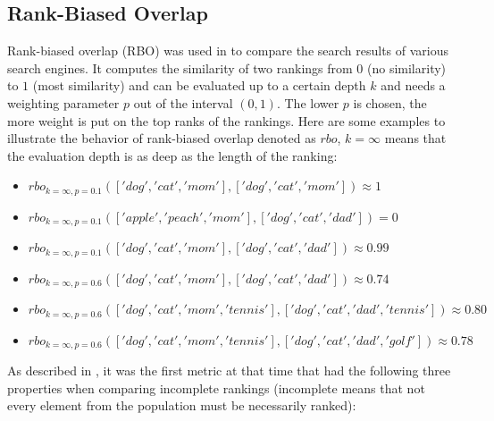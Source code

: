 \documentclass[draft,final]{thesisclass} %
\begin{document}
\subsection{Rank-Biased Overlap}
Rank-biased overlap (RBO) was used in \cite{rank_biased_overlap} to compare the search results of various search engines.
It computes the similarity of two rankings from $0$ (no similarity) to $1$ (most similarity) and can be evaluated up to a certain depth $k$ and needs a weighting parameter $p$ out of the interval $(0,1)$.
The lower $p$ is chosen, the more weight is put on the top ranks of the rankings.
Here are some examples to illustrate the behavior of rank-biased overlap denoted as $rbo$, $k=\infty$ means that the evaluation depth is as deep as the length of the ranking:
\begin{itemize}
    \item $rbo_{k=\infty,p=0.1}(['dog','cat','mom'],['dog','cat','mom']) \approx 1$
    \item $rbo_{k=\infty,p=0.1}(['apple','peach','mom'],['dog','cat','dad']) = 0$
    \item $rbo_{k=\infty,p=0.1}(['dog','cat','mom'],['dog','cat','dad']) \approx 0.99$
    \item $rbo_{k=\infty,p=0.6}(['dog','cat','mom'],['dog','cat','dad']) \approx 0.74$
    \item $rbo_{k=\infty,p=0.6}(['dog','cat','mom','tennis'],['dog','cat','dad','tennis']) \approx 0.80$
    \item $rbo_{k=\infty,p=0.6}(['dog','cat','mom','tennis'],['dog','cat','dad','golf']) \approx 0.78$
\end{itemize}
As described in \cite[1]{rank_biased_overlap}, it was the first metric at that time that had the following three properties when comparing incomplete rankings (incomplete means that not every element from the population must be necessarily ranked):
\end{document}
